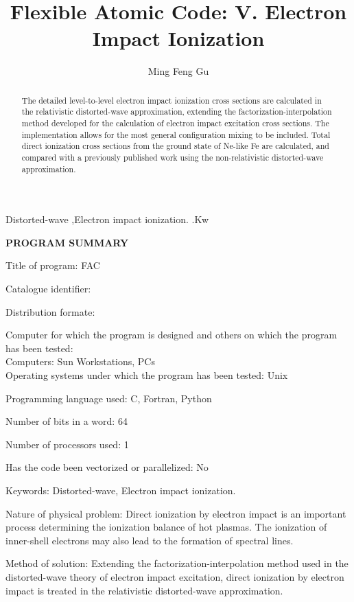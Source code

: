 \documentclass{elsart}
\begin{document}
\begin{frontmatter}

\title{Flexible Atomic Code: V. Electron Impact Ionization}  
\author{Ming Feng Gu}
\address{Massachusetts Institute of Technology, Cambridge, MA 02139, USA}

\begin{abstract} 
The detailed level-to-level electron impact ionization cross sections are
calculated in the relativistic distorted-wave approximation, extending the 
factorization-interpolation method developed for the calculation of electron
impact excitation cross sections. The implementation allows for the most
general configuration mixing to be included. Total 
direct ionization cross sections from the ground state of Ne-like Fe
are calculated, and compared with a previously published work using
the non-relativistic distorted-wave approximation. 
\end{abstract}

\begin{keyword}
Distorted-wave \sep Electron impact ionization.
.Kw
\end{keyword}

\end{frontmatter}

\textbf{\large PROGRAM SUMMARY}

Title of program: FAC

Catalogue identifier:

Distribution formate:

Computer for which the program is designed and others on which the program has
been tested:\\
Computers: Sun Workstations, PCs\\
Operating systems under which the program has been tested: Unix

Programming language used: C, Fortran, Python

Number of bits in a word: 64

Number of processors used: 1

Has the code been vectorized or parallelized: No

Keywords: Distorted-wave, Electron impact ionization.

Nature of physical problem: Direct ionization by electron impact is an
important process determining the ionization balance of hot plasmas. The
ionization of inner-shell electrons may also lead to the formation of spectral
lines. 

Method of solution: Extending the factorization-interpolation method used in
the distorted-wave theory of electron impact excitation, direct ionization by
electron impact is treated in the relativistic distorted-wave approximation.  
\end{document}
